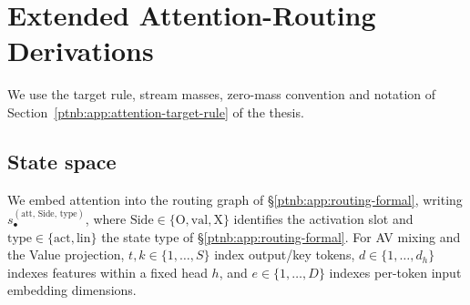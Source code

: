 \chapter{Extended Attention-Routing Derivations}\label{app:supp_attention}

We use the target rule, stream masses, zero-mass convention and notation of
Section~\ref{ptnb:app:attention-target-rule} of the thesis.

\section{State space}\label{ptnb:app:attention-state-space}

We embed attention into the routing graph of \S\ref{ptnb:app:routing-formal}, writing
$s_\bullet^{(\mathrm{att},\,\mathrm{Side},\,\mathrm{type})}$, where
$\mathrm{Side} \in \{\mathrm{O}, \mathrm{val}, \mathrm{X}\}$ identifies the activation slot and
$\mathrm{type} \in \{\mathrm{act}, \mathrm{lin}\}$ the state type of \S\ref{ptnb:app:routing-formal}.
For AV mixing and the Value projection, $t,k \in \{1,\dots,S\}$ index output/key tokens,
$d \in \{1,\dots,d_h\}$ indexes features within a fixed head $h$, and
$e \in \{1,\dots,D\}$ indexes per-token input embedding dimensions.

